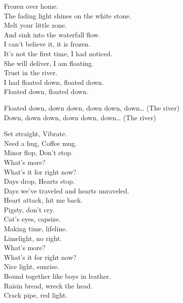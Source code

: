 Frozen over home. \\
The fading light shines on the white stone. \\
Melt your little zone. \\
And sink into the waterfall flow. \\

I can't believe it, it is frozen. \\
It's not the first time, I had noticed. \\
She will deliver, I am floating. \\
Trust in the river. \\
I had floated down, floated down. \\
Floated down, floated down. \\


Floated down, down down, down down, down… (The river) \\
Down, down down, down down, down… (The river) \\




Set straight, Vibrate. \\
Need a hug, Coffee mug. \\
Minor flop, Don't stop. \\

What's more? \\
What's it for right now? \\

Days drop, Hearts stop. \\
Days we've traveled and hearts unraveled. \\
Heart attack, hit me back. \\
Pigsty, don't cry. \\

Cat's eyes, capsize. \\
Making time, lifeline. \\
Limelight, no right. \\

What's more? \\
What's it for right now? \\

Nice light, sunrise. \\
Bound together like boys in leather. \\
Raisin bread, wreck the head. \\
Crack pipe, red light. \\

